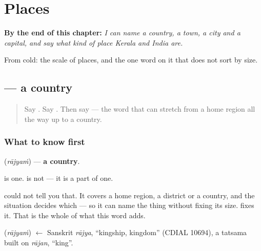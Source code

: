 
\chapter{Places}
\label{ch:ml-places}

\begin{chapteropening}
\textbf{By the end of this chapter:} \emph{I can name a country, a town, a city and a capital, and say what kind of place Kerala and India are.}

From cold: the scale of places, and the one word on it that does not sort by size.
\end{chapteropening}

\section[\texorpdfstring{\ml{രാജ്യം} (rājyaṁ)}{രാജ്യം (rājyaṁ)}]{ — a country}

\label{lesson:ML-C105-raajyam}



\begin{quote}
Say \textbf{}. Say \textbf{}. Then say \textbf{} — the word that can stretch from a home region all the way up to a country.
\end{quote}

\subsection*{What to know first}
\textbf{} (\emph{rājyaṁ}) — \textbf{a country}.

\textbf{} is one. \textbf{} is not — it is a part of one.

\textbf{} could not tell you that. It covers a home region, a district or a country, and the situation decides which — so it can name the thing without fixing its size. \textbf{} fixes it. That is the whole of what this word adds.

\begin{cousinweb}
\textbf{} (\emph{rājyaṁ}) $\leftarrow$ Sanskrit \emph{rājya}, \textquotedblleft{}kingship, kingdom\textquotedblright{} (CDIAL 10694), a tatsama built on \emph{rājan}, \textquotedblleft{}king\textquotedblright{}.
\end{cousinweb}

